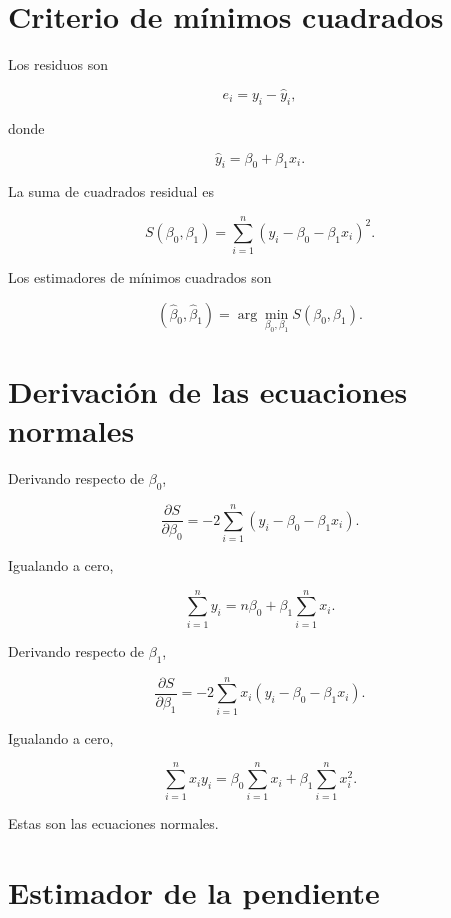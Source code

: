 \documentclass[
  spanish,
  10.5pt,
  letterpaper,
  DIV=11,
  numbers=noendperiod,
  oneside,
  open=any]{scrreprt}
\theoremstyle{definition}
\theoremstyle{definition}
\theoremstyle{plain}
\theoremstyle{remark}
\begin{document}
\section*{Criterio de mínimos
cuadrados}\label{criterio-de-muxednimos-cuadrados}


Los residuos son

\[
e_i
=
y_i
-
\widehat{y}_i,
\]

donde

\[
\widehat{y}_i
=
\beta_0+\beta_1x_i.
\]

La suma de cuadrados residual es

\[
S(\beta_0,\beta_1)
=
\sum_{i=1}^{n}
\left(
y_i-\beta_0-\beta_1x_i
\right)^2.
\]

Los estimadores de mínimos cuadrados son

\[
(\widehat{\beta}_0,\widehat{\beta}_1)
=
\arg\min_{\beta_0,\beta_1}
S(\beta_0,\beta_1).
\]

\section*{Derivación de las ecuaciones
normales}\label{derivaciuxf3n-de-las-ecuaciones-normales}


Derivando respecto de \(\beta_0\),

\[
\frac{\partial S}{\partial\beta_0}
=
-2
\sum_{i=1}^{n}
\left(
y_i-\beta_0-\beta_1x_i
\right).
\]

Igualando a cero,

\[
\sum_{i=1}^{n}
y_i
=
n\beta_0
+
\beta_1
\sum_{i=1}^{n}
x_i.
\]

Derivando respecto de \(\beta_1\),

\[
\frac{\partial S}{\partial\beta_1}
=
-2
\sum_{i=1}^{n}
x_i
\left(
y_i-\beta_0-\beta_1x_i
\right).
\]

Igualando a cero,

\[
\sum_{i=1}^{n}
x_iy_i
=
\beta_0
\sum_{i=1}^{n}
x_i
+
\beta_1
\sum_{i=1}^{n}
x_i^2.
\]

Estas son las ecuaciones normales.

\section*{Estimador de la pendiente}\label{estimador-de-la-pendiente}
\end{document}

